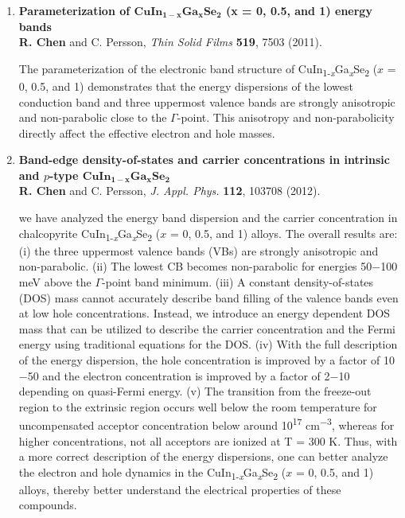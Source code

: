 \documentclass[a4paper, 12pt, titlepage,oneside,drop]{kthesis}
\begin{document}
\begin{enumerate}
\renewcommand{\labelenumi}{\Roman{enumi}}
\item{}  \textbf{Parameterization of $\mathbf {CuIn_{1-x}Ga_{x}Se_2}$ (x = 0, 0.5, and 1) energy bands}
\\\textbf{R. Chen} and C. Persson, \textit{Thin Solid Films} {\textbf {519}}, 7503 (2011).

The parameterization of the electronic band structure of CuIn\textsubscript{1-\textit{x}}Ga\textsubscript{\textit{x}}Se\textsubscript{2} ($x$ = 0, 0.5, and 1) demonstrates that the energy dispersions of the lowest conduction band
and three uppermost valence bands are strongly anisotropic and non-parabolic close to the $\Gamma$-point. This anisotropy and non-parabolicity directly affect the effective electron and hole masses.

\item{}\textbf{Band-edge density-of-states and carrier concentrations in intrinsic and $p$-type $\mathbf {CuIn_{1-x}Ga_{x}Se_2}$}
\\\textbf{R. Chen} and C. Persson, \textit{J. Appl. Phys.} {\textbf {112}}, 103708 (2012).

we have analyzed the energy band dispersion and the carrier concentration in chalcopyrite CuIn\textsubscript{1-\textit{x}}Ga\textsubscript{\textit{x}}Se\textsubscript{2} ($x$ = 0, 0.5, and 1) alloys. The overall results are: 
(i) the three uppermost valence bands (VBs) are strongly anisotropic and non-parabolic. (ii) The lowest CB becomes non-parabolic for energies 50$-$100 meV above the $\Gamma$-point band minimum. (iii) A constant density-of-states (DOS) mass 
cannot accurately describe band filling of the valence bands even at low hole concentrations. Instead, we introduce an energy dependent DOS mass that can be utilized to describe the carrier concentration and the Fermi energy using 
traditional equations for the DOS. (iv) With the full description of the energy dispersion, the hole concentration is improved by a factor of 10$-$50 and the electron concentration is improved by a factor of 2$-$10 depending on
quasi-Fermi energy. (v) The transition from the freeze-out region to the extrinsic region occurs well below the room temperature for uncompensated acceptor concentration below around 10\textsuperscript{17} cm\textsuperscript{$-$3}, whereas for higher concentrations, not all 
acceptors are ionized at T = 300 K. Thus, with a more correct description of the energy dispersions, one can better analyze the electron and hole dynamics in the
CuIn\textsubscript{1-\textit{x}}Ga\textsubscript{\textit{x}}Se\textsubscript{2} ($x$ = 0, 0.5, and 1) alloys, thereby better understand the electrical properties of these compounds. 


\end{enumerate}
\end{document}
